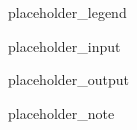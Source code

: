 \begin{problem}

placeholder_legend

\InputFile
placeholder_input

\OutputFile
placeholder_output

\Example

\begin{example}
%
\end{example}

\Note
placeholder_note

\end{problem}

